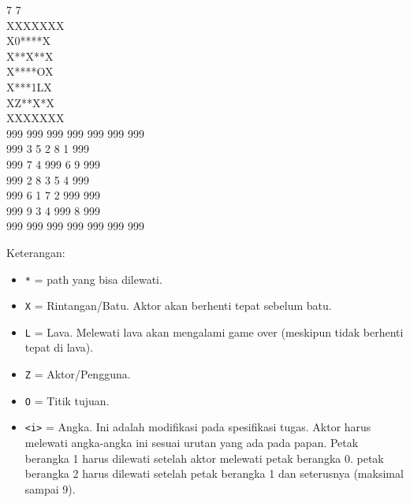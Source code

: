 \begin{tcolorbox}[
        title=Contoh Input,
        listing only,
        enhanced,
        sharp corners,
        colback=black!2,
        colframe=black!70,
        boxrule=0.7pt,
        fonttitle=\bfseries\small,
        left=2mm,
        right=2mm,
        top=1mm,
        bottom=1mm,
        listing options={basicstyle=\ttfamily\footnotesize, columns=fullflexible, keepspaces=true, breaklines=false, showstringspaces=false, showtabs=false, tabsize=2}
    ]
    7 7 \\
    XXXXXXX \\
    X0****X \\
    X**X**X \\
    X****OX \\
    X***1LX \\
    XZ**X*X \\
    XXXXXXX \\
    999 999 999 999 999 999 999 \\
    999 3 5 2 8 1 999 \\
    999 7 4 999 6 9 999 \\
    999 2 8 3 5 4 999 \\
    999 6 1 7 2 999 999 \\
    999 9 3 4 999 8 999 \\
    999 999 999 999 999 999 999 \\
\end{tcolorbox}

\noindent
Keterangan:
\begin{itemize}
    \item \texttt{*} = path yang bisa dilewati.
    \item \texttt{X} = Rintangan/Batu. Aktor akan berhenti tepat sebelum batu.
    \item \texttt{L} = Lava. Melewati lava akan mengalami game over (meskipun tidak berhenti tepat di lava).
    \item \texttt{Z} = Aktor/Pengguna.
    \item \texttt{O} = Titik tujuan.
    \item \texttt{<i>} = Angka. Ini adalah modifikasi pada spesifikasi tugas. Aktor harus melewati angka-angka ini sesuai urutan yang ada pada papan. Petak berangka 1 harus dilewati setelah aktor melewati petak berangka 0. petak berangka 2 harus dilewati setelah petak berangka 1 dan seterusnya (maksimal sampai 9).
\end{itemize}

